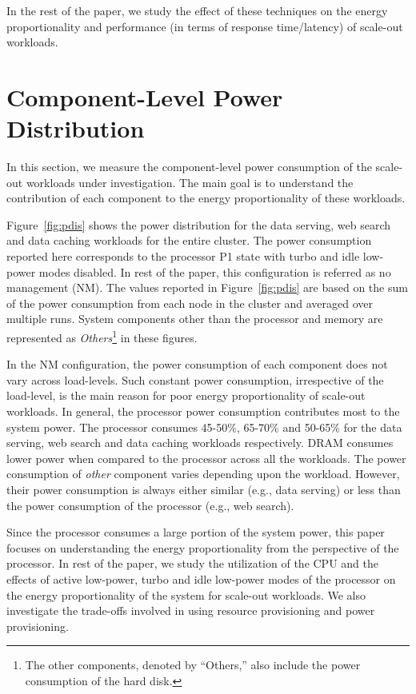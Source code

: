 \documentclass{sig-alternate}
\begin{document}
In the rest of the paper, we study the effect of these techniques on the 
energy proportionality and performance (in terms of response time/latency) 
of scale-out workloads. 



 \section{Component-Level Power Distribution}
\label{sec:powerdis}

In this section, we measure the component-level power consumption of 
the scale-out workloads under investigation. The main goal is to 
understand the contribution of each component to the energy 
proportionality of these workloads. 

Figure~\ref{fig:pdis} shows the power distribution
for the data serving, web search and data caching workloads for the entire 
cluster. The power consumption reported here corresponds to the processor P1 state with 
turbo and idle low-power modes disabled. In rest of the paper, this 
configuration is referred as no management (NM). The values reported in 
Figure~\ref{fig:pdis} are based on the sum of the power consumption from each node 
in the cluster and averaged over multiple runs. 
System components other than the processor and memory are represented
as \emph{Others}\footnote{The other components, denoted by ``Others,'' 
also include the power consumption of the hard disk.} in these figures. 

In the NM configuration, the power consumption of each component does not vary 
across load-levels. Such constant power consumption, irrespective of the load-level, 
is the main reason for poor energy proportionality of scale-out workloads. 
In general, the processor power consumption contributes most to the system power. 
The processor consumes 45-50\%, 65-70\% and 50-65\% 
for the data serving, web search and data caching workloads respectively. DRAM 
consumes lower power when compared to the processor across all the workloads. 
The power consumption of \emph{other} component varies depending upon the workload. 
However, their power consumption is always either similar (e.g., data serving) 
or less than the power consumption of the processor (e.g., web search). 

Since the processor consumes a large portion of the system power, this paper focuses on 
understanding the energy proportionality from the perspective of the processor. 
In rest of the paper, we study the utilization of the CPU and the effects of 
active low-power, turbo and idle low-power modes of the processor on the energy proportionality of the 
system for scale-out workloads. We also investigate the trade-offs involved in 
using resource provisioning and power provisioning. 
\end{document}
